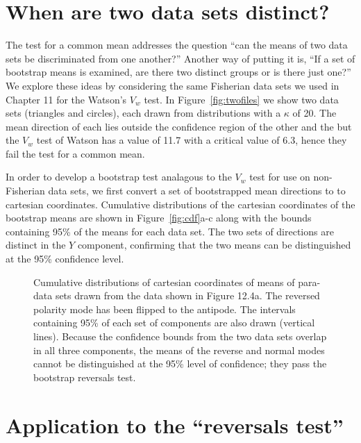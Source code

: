\section{ When are two data sets distinct?}
 

The test for a common mean addresses the question ``can the means of two data
sets be discriminated from one another?''  
Another way of putting it is,  ``If a set of bootstrap means is examined, 
are there two distinct groups or is there
just one?''  We explore these ideas by considering  the same Fisherian data sets
we used in Chapter 11 for the Watson's $V_w$ test.  
In Figure~\ref{fig:twofiles} we show  two data sets (triangles and circles), 
each drawn from distributions with a $\kappa$ of 20.
The mean direction of each lies outside the confidence region of the other and the 
 but the $V_w$ test of 
 Watson has a value of 11.7 with a critical value of 6.3, hence they  fail the test for a common mean. 

In order to develop a bootstrap test analagous to the $V_w$ test for use on non-Fisherian data sets, we first convert a set of bootstrapped mean  directions to 
to cartesian coordinates. Cumulative distributions of the cartesian coordinates of the
bootstrap means  are shown in Figure~\ref{fig:cdf}a-c along with the bounds containing 95\% of the means for each data set.    The two sets of directions are distinct in the $Y$ component, confirming that the two means can  be distinguished at the 95\% confidence level.

 \begin{figure}[h!tb]
\epsfxsize 14cm
\centering {}
\caption{Cumulative distributions of cartesian coordinates of  means of 
para-data sets drawn from the data shown in
Figure 12.4a. The reversed polarity mode has been 
flipped to the antipode.  The intervals containing 95\% of each
set of components are also drawn (vertical lines).
  Because the confidence bounds from the two  data sets overlap in all
three components, the means of the reverse and normal modes  cannot
be distinguished at the 95\% level of confidence; they pass the
bootstrap reversals test.}
\label{fig:revtest}
\end{figure}



\section {Application to the ``reversals test''}


